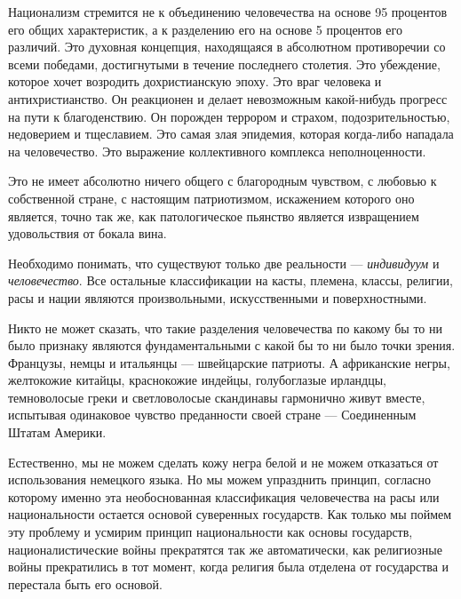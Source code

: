 Национализм стремится не к объединению человечества на основе 95 процентов его общих характеристик, а к разделению его на основе 5 процентов его различий. Это духовная концепция, находящаяся в абсолютном противоречии со всеми победами, достигнутыми в течение последнего столетия. Это убеждение, которое хочет возродить дохристианскую эпоху. Это враг человека и антихристианство. Он реакционен и делает невозможным какой-нибудь прогресс на пути к благоденствию. Он порожден террором и страхом, подозрительностью, недоверием и тщеславием. Это самая злая эпидемия, которая когда-либо нападала на человечество. Это выражение коллективного комплекса неполноценности.

Это не имеет абсолютно ничего общего с благородным чувством, с любовью к собственной стране, с настоящим патриотизмом, искажением которого оно является, точно так же, как патологическое пьянство является извращением удовольствия от бокала вина.

Необходимо понимать, что существуют только две реальности — \textit{индивидуум} и \textit{человечество}. Все остальные классификации на касты, племена, классы, религии, расы и нации являются произвольными, искусственными и поверхностными.

Никто не может сказать, что такие разделения человечества по какому бы то ни было признаку являются фундаментальными с какой бы то ни было точки зрения. Французы, немцы и итальянцы — швейцарские патриоты. А африканские негры, желтокожие китайцы, краснокожие индейцы, голубоглазые ирландцы, темноволосые греки и светловолосые скандинавы гармонично живут вместе, испытывая одинаковое чувство преданности своей стране — Соединенным Штатам Америки.

Естественно, мы не можем сделать кожу негра белой и не можем отказаться от использования немецкого языка. Но мы можем упразднить принцип, согласно которому именно эта необоснованная классификация человечества на расы или национальности остается основой суверенных государств. Как только мы поймем эту проблему и усмирим принцип национальности как основы государств, националистические войны прекратятся так же автоматически, как религиозные войны прекратились в тот момент, когда религия была отделена от государства и перестала быть его основой.
